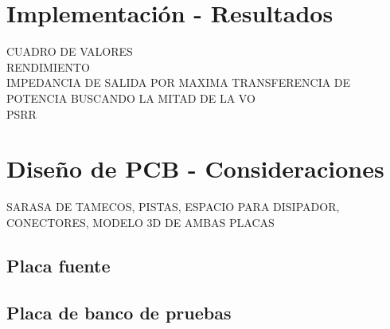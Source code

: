 \section{Implementaci\'on - Resultados}

CUADRO DE VALORES\\
RENDIMIENTO\\
IMPEDANCIA DE SALIDA POR MAXIMA TRANSFERENCIA DE POTENCIA BUSCANDO LA MITAD DE LA VO\\
PSRR\\



\section{Dise\~no de PCB - Consideraciones}

SARASA DE TAMECOS, PISTAS, ESPACIO PARA DISIPADOR, CONECTORES, MODELO 3D DE AMBAS PLACAS

\subsection{Placa fuente}

\subsection{Placa de banco de pruebas}

